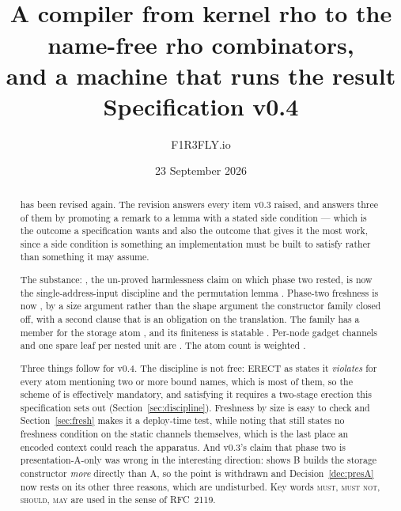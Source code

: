 \documentclass[11pt,a4paper]{article}
\title{\textbf{\Comb}\\[1mm]
\large A compiler from kernel rho to the name-free rho combinators,\\
and a machine that runs the result\\[2mm]
\normalsize Specification v0.4}
\author{F1R3FLY.io}
\date{23 September 2026}
\newcommand{\MUST}{\textsc{must}}
\newcommand{\MUSTNOT}{\textsc{must not}}
\newcommand{\SHOULD}{\textsc{should}}
\newcommand{\MAY}{\textsc{may}}
\newcommand{\ERECT}{\mathrm{ERECT}}
\theoremstyle{definition}
\theoremstyle{plain}
\begin{document}
\maketitle

\begin{abstract}
\noindent
\cite{draft3} has been revised again. The revision answers every item v0.3
raised, and answers three of them by promoting a remark to a lemma with a
stated side condition --- which is the outcome a specification wants and also
the outcome that gives it the most work, since a side condition is something
an implementation must be built to satisfy rather than something it may
assume.

The substance: \cite[Rem.~6.10]{draft3}, the un-proved harmlessness claim on
which phase two rested, is now the single-address-input discipline
\cite[Def.~6.10]{draft3} and the permutation lemma \cite[Lem.~6.11]{draft3}.
Phase-two freshness is now \cite[Lem.~6.14]{draft3}, by a size argument rather
than the shape argument the constructor family closed off, with a second
clause that is an obligation on the translation. The family has a member for
the storage atom \cite[Def.~3.8]{draft3}, and its finiteness is statable
\cite[Rem.~6.15]{draft3}. Per-node gadget channels and one spare leaf per
nested unit are \cite[Rem.~6.13]{draft3}. The atom count is weighted
\cite[Lem.~9.2]{draft3}.

Three things follow for v0.4. The discipline is not free: $\ERECT$ as
\cite[Def.~6.8]{draft3} states it \emph{violates} \cite[Def.~6.10]{draft3} for
every atom mentioning two or more bound names, which is most of them, so the
scheme of \cite[Rem.~6.12]{draft3} is effectively mandatory, and satisfying it
requires a two-stage erection this specification sets out
(Section~\ref{sec:discipline}). Freshness by size is easy to check and
Section~\ref{sec:fresh} makes it a deploy-time test, while noting that
\cite[Def.~6.8]{draft3} still states no freshness condition on the static
channels themselves, which is the last place an encoded context could reach
the apparatus. And v0.3's claim that phase two is presentation-A-only was
wrong in the interesting direction: \cite[Rem.~3.9]{draft3} shows B builds the
storage constructor \emph{more} directly than A, so the point is withdrawn and
Decision~\ref{dec:presA} now rests on its other three reasons, which are
undisturbed.
Key words \MUST, \MUSTNOT, \SHOULD, \MAY{} are used in the sense of RFC~2119.
\end{abstract}

\tableofcontents
\end{document}
